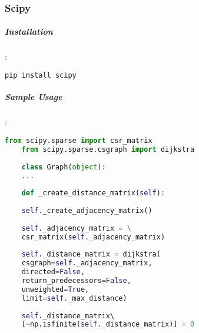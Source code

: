 	\subsubsection{Scipy \cite{Scipy}}
	\subparagraph{Installation}:
	\begin{lstlisting}[language=bash]
	pip install scipy
	\end{lstlisting}
	
	\subparagraph{Sample Usage}:
	\begin{lstlisting}[language=python, caption=Scipy example]
	from scipy.sparse import csr_matrix
	from scipy.sparse.csgraph import dijkstra
	
	class Graph(object):
	...
	
	def _create_distance_matrix(self):
	
	self._create_adjacency_matrix()
	
	self._adjacency_matrix = \
	csr_matrix(self._adjacency_matrix)
	
	self._distance_matrix = dijkstra( 
	csgraph=self._adjacency_matrix, 
	directed=False, 
	return_predecessors=False, 
	unweighted=True,
	limit=self._max_distance)
	
	self._distance_matrix\ 
	[~np.isfinite(self._distance_matrix)] = 0
	\end{lstlisting}